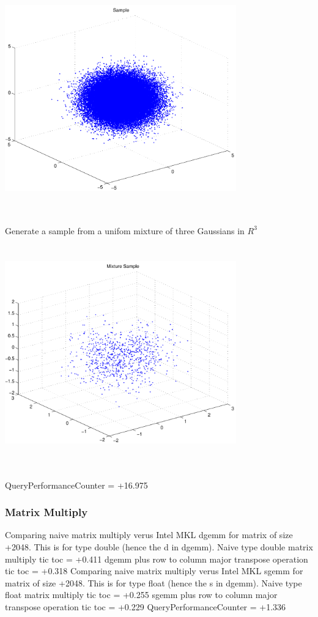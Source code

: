 \documentclass[9pt]{article}
\theoremstyle{plain}
\theoremstyle{definition}
\theoremstyle{remark}
\numberwithin{equation}{section}
\begin{document}
\includegraphics[width=10.0cm,height=10.0cm]{R_3_Normal.pdf}

Generate a sample from a unifom mixture of three Gaussians in $R^3$
\includegraphics[width=10.0cm,height=10.0cm]{R_3_Normal_Mixture.pdf}

QueryPerformanceCounter  =  +16.975
\subsubsection{Matrix Multiply}
Comparing naive matrix multiply verus Intel MKL dgemm for matrix of size +2048.
This is for type double (hence the d in dgemm).
Naive type double matrix multiply tic toc  =  +0.411
dgemm plus row to column major transpose operation tic toc  =  +0.318
Comparing naive matrix multiply verus Intel MKL sgemm for matrix of size +2048.
This is for type float (hence the s in dgemm).
Naive type float matrix multiply tic toc  =  +0.255
sgemm plus row to column major transpose operation tic toc  =  +0.229
QueryPerformanceCounter  =  +1.336
\end{document}
